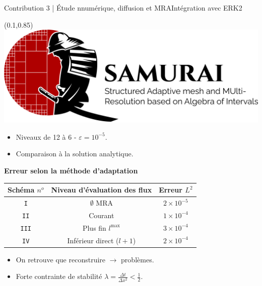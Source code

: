 \begin{frame}{Contribution 3 | Étude nnumérique, diffusion et MRA}{Intégration avec ERK2}
    \begin{textblock*}{40pt}(0.1\paperwidth,0.85\paperheight)
        \includegraphics[scale=.03]{medias/2_/1_/light_logo.png}
    \end{textblock*}
    \begin{itemize}
        \item Niveaux de 12 à 6 - $\varepsilon = 10^{-5}$.
        \item Comparaison à la solution analytique.
    \end{itemize}\pause
    \begin{center}
        \textbf{\large{\color{Primary}Erreur selon la méthode d'adaptation}}
        \begin{tabular}
            {|c|c|c|}\hline Schéma $n^o$ & Niveau d'évaluation des flux & Erreur $L^2$ \\\hline\texttt{I} & $\emptyset$ MRA & $2 \times 10^{-5}$ \\\texttt{II} & Courant & $1 \times 10^{-4}$ \\\texttt{III} & Plus fin $l^{\max}$& $3 \times 10^{-4}$ \\\texttt{IV} & Inférieur direct ($l+1$) & $2 \times 10^{-4}$ \\\hline
        \end{tabular}
    \end{center}
    \pause 
    \begin{itemize}
        \item On retrouve que reconstruire $\rightarrow$ problèmes.
        \item Forte contrainte de stabilité $\lambda = \frac{\Delta t}{ \Delta x^2 } < \frac{1}{2}$.
    \end{itemize}
\end{frame}
